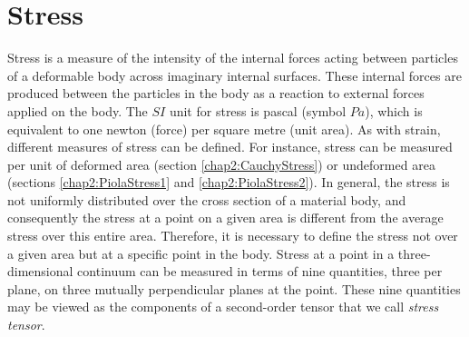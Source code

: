 \section{Stress}
Stress is a measure of the intensity of the internal forces acting between particles of a deformable body across imaginary internal surfaces. These internal forces are produced between the particles in the body as a reaction to external forces applied on the body. The $SI$ unit for stress is pascal (symbol $Pa$), which is equivalent to one newton (force) per square metre (unit area). As with strain, different measures of stress can be defined. For instance, stress can be measured per unit of deformed area (section \ref{chap2:CauchyStress}) or undeformed area (sections \ref{chap2:PiolaStress1} and \ref{chap2:PiolaStress2}). In general, the stress is not uniformly distributed over the cross section of a material body, and consequently the stress at a point on a given area is different from the average stress over this entire area. Therefore, it is necessary to define the stress not over a given area but at a specific point in the body. Stress at a point in a three-dimensional continuum can be measured in terms of nine quantities, three per plane, on three mutually perpendicular planes at the point. These nine quantities may be viewed as the components of a second-order tensor that we call \emph{stress tensor}. 

